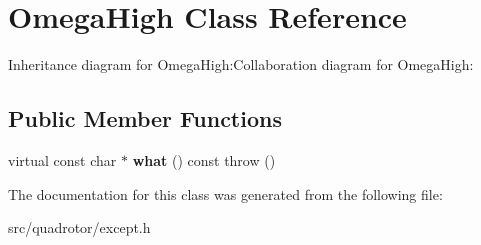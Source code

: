 \hypertarget{classOmegaHigh}{
\section{OmegaHigh Class Reference}
\label{classOmegaHigh}
}
Inheritance diagram for OmegaHigh:Collaboration diagram for OmegaHigh:\subsection*{Public Member Functions}
\begin{DoxyCompactItemize}
\item 
\hypertarget{classOmegaHigh_a9b61b9efec3c6adf95be4db650903c81}{
virtual const char $\ast$ {\bfseries what} () const   throw ()}
\label{classOmegaHigh_a9b61b9efec3c6adf95be4db650903c81}

\end{DoxyCompactItemize}


The documentation for this class was generated from the following file:\begin{DoxyCompactItemize}
\item 
src/quadrotor/except.h\end{DoxyCompactItemize}
